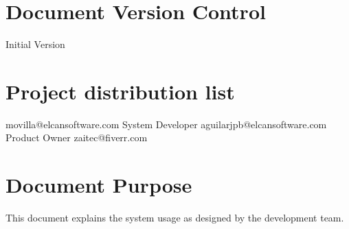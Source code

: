 \section{Document Version Control}
\begin{elcanversions}
	 {Initial Version}
\end{elcanversions}

\section{Project distribution list}

\begin{elcandistribution}

	 {movilla@elcansoftware.com} {\distribdate} 
	 {System Developer} {aguilarjpb@elcansoftware.com} {\distribdate}
	 {Product Owner} {zaitec@fiverr.com} {\distribdate}	
\end{elcandistribution}

\section{Document Purpose}
This document explains the system usage as designed by the development team.